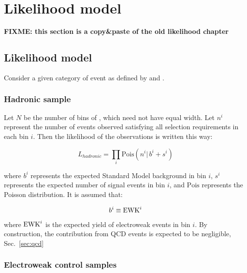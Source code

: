 \section{Likelihood model}
\label{sec:likelihood}

\textbf{FIXME: this section is a copy&paste of the old likelihood chapter}
\subsection{Likelihood model}

Consider a given category of event as defined by \njet and \nb.

\subsubsection{Hadronic sample}
\label{sec:hadronicLikelihood}
Let $N$ be the number of bins of \HT, which need not have equal width.
Let $n^i$ represent the number of events observed satisfying all
selection requirements in each \HT bin $i$.  Then the likelihood of
the observations is written this way:

\begin{equation}
L_{hadronic}=\prod_i \mathrm{Pois}(n^i |\, b^i + s^i)
\label{eq:hadronicLikelihood}
\end{equation}

where $b^i$ represents the expected Standard Model background in bin
$i$, $s^i$ represents the expected number of signal events in bin $i$,
and $\mathrm{Pois}$ represents the Poisson distribution.  It is
assumed that:

\begin{equation}
  b^i\equiv \ewk^i
  \label{eq:ewkTotal}
\end{equation}

where $\ewk^i$ is the expected yield of electroweak events in bin $i$.
By construction, the contribution from QCD events is expected to be negligible, 
Sec.~\ref{sec:qcd}



\subsubsection{Electroweak control samples\label{sec:ewk}}

